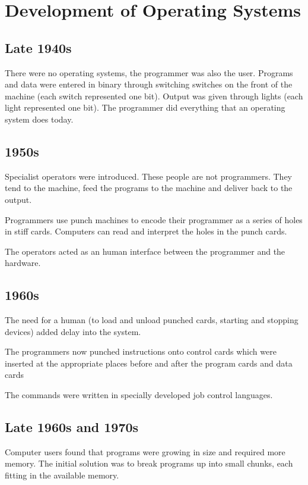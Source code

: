 
\section*{Development of Operating Systems}

\subsection*{Late 1940s}
There were no operating systems, the programmer was also the user. Programs and data were entered in binary through switching switches on the front of the machine (each switch represented one bit). Output was given through lights (each light represented one bit). The programmer did everything that an operating system does today.

\subsection*{1950s}
Specialist operators were introduced. These people are not programmers. They tend to the machine, feed the programs to the machine and deliver back to the output.

Programmers use punch machines to encode their programmer as a series of holes in stiff cards. Computers can read and interpret the holes in the punch cards.

The operators acted as an human interface between the programmer and the hardware. 

\subsection*{1960s}
The need for a human (to load and unload punched cards, starting and stopping devices) added delay into the system. 

The programmers now punched instructions onto control cards which were inserted at the appropriate places before and after the program cards and data cards

The commands were written in specially developed job control languages. 

\subsection*{Late 1960s and 1970s}
Computer users found that programs were growing in size and required more memory. The initial solution was to break programs up into small chunks, each fitting in the available memory.

